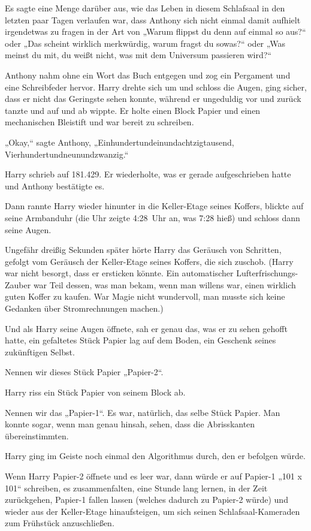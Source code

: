 {Es sagte eine Menge darüber aus, wie das Leben in diesem Schlafsaal in den letzten paar Tagen verlaufen war, dass Anthony sich nicht einmal damit aufhielt irgendetwas zu fragen in der Art von „Warum flippst du denn auf einmal so aus?“ oder „Das scheint wirklich merkwürdig, warum fragst du sowas?“ oder „Was meinst du mit, du weißt nicht, was mit dem Universum passieren wird?“

Anthony nahm ohne ein Wort das Buch entgegen und zog ein Pergament und eine Schreibfeder hervor. Harry drehte sich um und schloss die Augen, ging sicher, dass er nicht das Geringste sehen konnte, während er ungeduldig vor und zurück tanzte und auf und ab wippte. Er holte einen Block Papier und einen mechanischen Bleistift und war bereit zu schreiben.

„Okay,“ sagte Anthony, „Einhundertundeinundachtzigtausend, Vierhundertundneunundzwanzig.“

Harry schrieb auf 181.429. Er wiederholte, was er gerade aufgeschrieben hatte und Anthony bestätigte es.

Dann rannte Harry wieder hinunter in die Keller-Etage seines Koffers, blickte auf seine Armbanduhr (die Uhr zeigte 4:28~Uhr an, was 7:28 hieß) und schloss dann seine Augen.

Ungefähr dreißig Sekunden später hörte Harry das Geräusch von Schritten, gefolgt vom Geräusch der Keller-Etage seines Koffers, die sich zuschob. (Harry war nicht besorgt, dass er ersticken könnte. Ein automatischer Lufterfrischungs-Zauber war Teil dessen, was man bekam, wenn man willens war, einen wirklich guten Koffer zu kaufen. War Magie nicht wundervoll, man musste sich keine Gedanken über Stromrechnungen machen.)

Und als Harry seine Augen öffnete, sah er genau das, was er zu sehen gehofft hatte, ein gefaltetes Stück Papier lag auf dem Boden, ein Geschenk seines zukünftigen Selbst.

Nennen wir dieses Stück Papier „Papier-2“.

Harry riss ein Stück Papier von seinem Block ab.

Nennen wir das „Papier-1“. Es war, natürlich, das selbe Stück Papier. Man konnte sogar, wenn man genau hinsah, sehen, dass die Abrisskanten übereinstimmten.

Harry ging im Geiste noch einmal den Algorithmus durch, den er befolgen würde.

Wenn Harry Papier-2 öffnete und es leer war, dann würde er auf Papier-1 „101 x 101“ schreiben, es zusammenfalten, eine Stunde lang lernen, in der Zeit zurückgehen, Papier-1 fallen lassen (welches dadurch zu Papier-2 würde) und wieder aus der Keller-Etage hinaufsteigen, um sich seinen Schlafsaal-Kameraden zum Frühstück anzuschließen.

}

